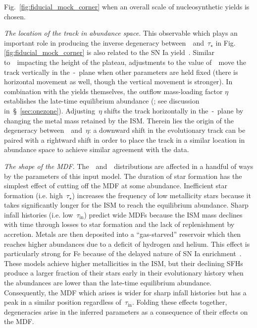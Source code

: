 \documentclass[ms.tex]{subfiles}
\begin{document}
Fig.~\ref{fig:fiducial_mock_corner} when an overall scale of nucleosynthetic
yields is chosen.
\par
\textit{The location of the track in abundance space.}
This observable which plays an important role in producing the inverse
degeneracy between~\yfecc~and~$\tau_\star$ in Fig.
\ref{fig:fiducial_mock_corner} is also related to the SN Ia yield~\yfeia.
Similar to~\yfecc~impacting the height of the plateau, adjustments to the
value of~\yfeia~move the track vertically in the~\afe-\feh~plane when other
parameters are held fixed (there is horizontal movement as well, though the
vertical movement is stronger).
In combination with the yields themselves, the outflow mass-loading factor
$\eta$ establishes the late-time equilibrium abundance (\citealp{Weinberg2017};
see discussion in~\S~\ref{sec:onezone}).
Adjusting~$\eta$ shifts the track horizontally in the~\afe-\feh~plane by
changing the metal mass retained by the ISM.
Therein lies the origin of the degeneracy between~\yfeia~and~$\eta$: a
downward shift in the evolutionary track can be paired with a rightward shift
in order to place the track in a similar location in abundance space to achieve
similar agreement with the data.
\par
\textit{The shape of the MDF.}
The~\ah~and~\feh~distributions are affected in a handful of ways by the
parameters of this input model.
The duration of star formation has the simplest effect of cutting off the MDF
at some abundance.
Inefficient star formation (i.e. high~$\tau_\star$) increases the frequency of
low metallicity stars because it takes significantly longer for the ISM to
reach the equilibrium abundance.
Sharp infall histories (i.e. low~$\tau_\text{in}$) predict wide MDFs because
the ISM mass declines with time through losses to star formation and the lack
of replenishment by accretion.
Metals are then deposited into a ``gas-starved'' reservoir which then reaches
higher abundances due to a deficit of hydrogen and helium.
This effect is particularly strong for Fe because of the delayed nature of SN
Ia enrichment~\citep{Weinberg2017}.
These models achieve higher metallicities in the ISM, but their declining SFHs
produce a larger fraction of their stars early in their evolutionary history
when the abundances are lower than the late-time equilibrium abundance.
Consequently, the MDF which arises is wider for sharp infall histories but has
a peak in a similar position regardless of~$\tau_\text{in}$.
Folding these effects together, degeneracies arise in the inferred parameters
as a consequence of their effects on the MDF.
\end{document}
